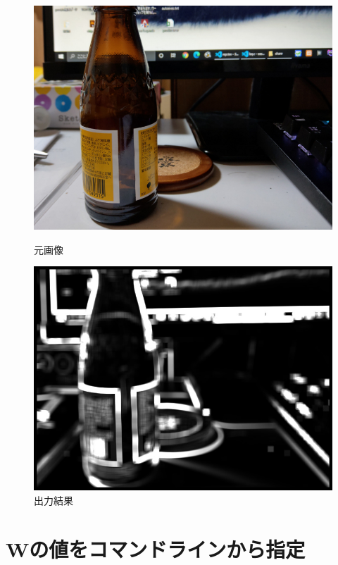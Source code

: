 \documentclass[11pt]{jarticle}
\begin{document}
\begin{figure}[t]
    \begin{minipage}{0.5\hsize}
        \centering
        \includegraphics[scale=.3]{mae.jpg}
        \caption{元画像}
        \label{mae}
    \end{minipage}
    \begin{minipage}{0.5\hsize}
        \centering
        \includegraphics[scale=.3]{out2.jpg}
        \caption{出力結果}
        \label{out2}
    \end{minipage}
\end{figure}

\section{Wの値をコマンドラインから指定}
\end{document}
